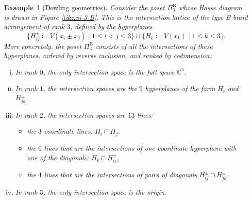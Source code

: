 \documentclass[11pt,a4paper]{amsart}
\theoremstyle{results}
\theoremstyle{definitions}
\newtheorem{example}[thm]{Example}
\def\C{\mathbb{C}}
\begin{document}
\begin{example}[Dowling geometries]
Consider the poset $\Pi^{\textrm{B}}_3$ whose Hasse diagram is drawn in Figure \ref{tikz:pi-3-B}. This is the intersection lattice of the type B braid arrangement of rank $3$, defined by the hyperplanes \[
\bigg\{ H_{ij}^{\pm} \coloneqq V(x_i \pm x_j) \mid 1 \leqslant i < j \leqslant 3 \bigg\} \cup \bigg\{ H_k \coloneqq V(x_k) \mid 1 \leqslant k \leqslant 3 \bigg\}. 
\]  More concretely, the poset $\Pi^{\textrm{B}}_3$ consists of all the intersections of these hyperplanes, ordered by reverse inclusion, and ranked by codimension: 
\begin{enumerate}[(i)]
    \item In rank $0$, the only intersection space is the full space $\C^3$. 
    \item In rank $1$, the intersection spaces are the $9$ hyperplanes of the form $H_i$ and $H_{jk}^{\pm}$. 
    \item In rank $2$, the intersection spaces are $13$ lines: 
    \begin{itemize}[--]
    \item the $3$ coordinate lines: $H_{i} \cap H_j$.  
    \item the $6$ lines that are the intersections of one coordinate hyperplane with one of the diagonals: $H_k \cap H_{ij}^{\pm}$,
    \item the $4$ lines that are the intersections of pairs of diagonals $H_{ij}^{\pm} \cap H_{jk}^{\pm}$. 
    \end{itemize}
    \item In rank $3$, the only intersection space is the origin. 
\end{enumerate}


\end{example}
\end{document}

